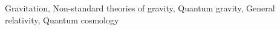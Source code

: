 \documentclass[twocolumn]{aastex631}
\begin{document}
Gravitation, Non-standard theories of gravity, Quantum gravity, General relativity, Quantum cosmology
\end{document}
